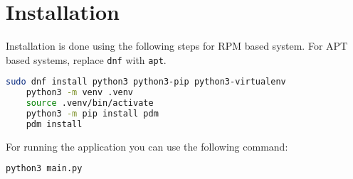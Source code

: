 \section{Installation}

Installation is done using the following steps for RPM based system. For APT based systems, replace \texttt{dnf} with \texttt{apt}. 
\begin{lstlisting}[language=bash]
    sudo dnf install python3 python3-pip python3-virtualenv
    python3 -m venv .venv
    source .venv/bin/activate
    python3 -m pip install pdm
    pdm install
\end{lstlisting}

For running the application you can use the following command:
\begin{lstlisting}[language=bash]
    python3 main.py
\end{lstlisting}
